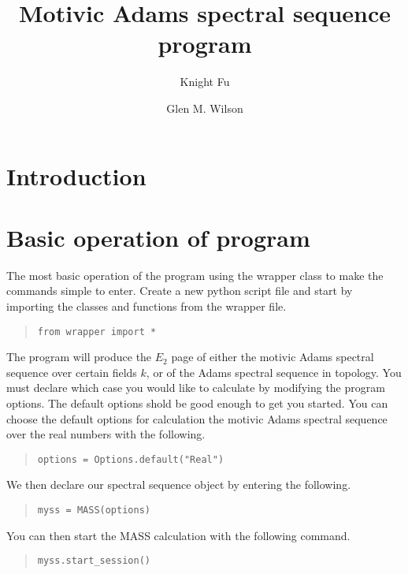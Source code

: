 \documentclass{article}
\begin{document}
\title{Motivic Adams spectral sequence program}
\author{Knight Fu}
\author{Glen M. Wilson}
\maketitle


\section{Introduction}

\section{Basic operation of program}
The most basic operation of the program using the wrapper class to
make the commands simple to enter. Create a new python script file and
start by importing the classes and functions from the wrapper file.

\begin{quote}
\begin{verbatim}
from wrapper import *
\end{verbatim}
\end{quote}

The program will produce the $E_2$ page of either the motivic Adams
spectral sequence over certain fields $k$, or of the Adams spectral
sequence in topology. You must declare which case you would like to
calculate by modifying the program options. The default options shold
be good enough to get you started. You can choose the default options
for calculation the motivic Adams spectral sequence over the real
numbers with the following.
\begin{quote}
\begin{verbatim}
options = Options.default("Real")
\end{verbatim}
\end{quote}

We then declare our spectral sequence object by entering the
following.
\begin{quote}
\begin{verbatim}
myss = MASS(options)
\end{verbatim}
\end{quote}
You can then start the MASS calculation with the following command.
\begin{quote}
\begin{verbatim}
myss.start_session()
\end{verbatim}
\end{quote}
\end{document}
